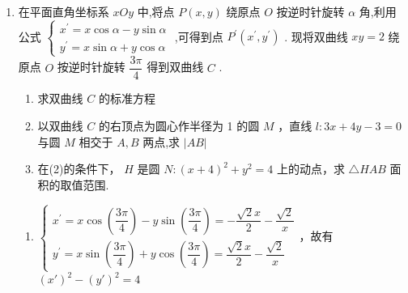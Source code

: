 \begin{enumerate}
\begin{jieda}
\begin{enumerate}
\begin{dingautolist}{172}
                将 $y =  - {mx}$ 代入椭圆方程 ${x}^{2} + 3{y}^{2} = 6$ 中，有 ${x}_{3}^{2} = \dfrac{6}{1 + 3{m}^{2}},{y}_{3}^{2} = \dfrac{6{m}^{2}}{1 + 3{m}^{2}}$，故 ${\left| OH\right| }^{2} = {\left| OH'\right| }^{2} = {x}_{3}^{2} + {y}_{3}^{2} = \dfrac{6 + 6{m}^{2}}{1 + 3{m}^{2}}$ ，则 $\dfrac{\sqrt{6}}{\left| MN\right| } + \dfrac{3}{{\left| OH\right| }^{2}} = \dfrac{\left( {m}^{2} + 3\right) }{2\left( {{m}^{2} + 1}\right) } + \dfrac{3{m}^{2} + 1}{2\left( {{m}^{2} + 1}\right) } = 2$.
            \end{dingautolist}
        \end{enumerate}
    \end{jieda}

    \clearpage
    \item 在平面直角坐标系 ${xOy}$ 中,将点 $P\left( {x,y}\right)$ 绕原点 $O$ 按逆时针旋转 $\alpha$ 角,利用公式 $\left\{  \begin{array}{l} {x}^{\prime } = x\cos \alpha  - y\sin \alpha \\  {y}^{\prime } = x\sin \alpha  + y\cos \alpha  \end{array}\right.$ ,可得到点 ${P}^{\prime }\left( {{x}^{\prime },{y}^{\prime }}\right)$ . 现将双曲线 ${xy} = 2$ 绕原点 $O$ 按逆时针旋转 $\dfrac{3\pi }{4}$ 得到双曲线 $C$ .
    \begin{enumerate}
        \item 求双曲线 $C$ 的标准方程
        \item 以双曲线 $C$ 的右顶点为圆心作半径为 1 的圆 $M$ ，直线 $l : {3x} + {4y} - 3 = 0$ 与圆 $M$ 相交于 $A,B$ 两点,求 $\left| {AB}\right|$
        \item 在(2)的条件下， $H$ 是圆 $N : {\left( x + 4\right) }^{2} + {y}^{2} = 4$ 上的动点，求 $\bigtriangleup  {HAB}$ 面积的取值范围.
    \end{enumerate}

    \begin{jieda}
        \begin{enumerate}
            \item $\left\{  \begin{array}{l} {x}^{\prime } = x\cos\left(\dfrac{3\pi}{4}\right)  - y\sin\left(\dfrac{3\pi}{4}\right) = -\dfrac{\sqrt{2}x}{2} -\dfrac{\sqrt{2}}{x} \\  {y}^{\prime } = x\sin \left(\dfrac{3\pi}{4}\right)  + y\cos \left(\dfrac{3\pi}{4}\right)  = \dfrac{\sqrt{2}x}{2} - \dfrac{\sqrt{2}}{x}\end{array}\right.$，故有$(x')^2 - (y')^2 = 4$
            

\end{enumerate}
\end{jieda}
\end{enumerate}
